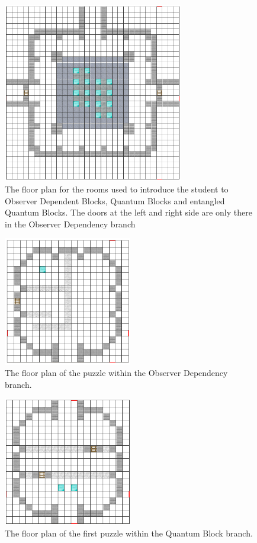 \documentclass[11pt,twoside]{report} %
\begin{document}
\begin{figure}[h!]
\centering
\includegraphics[width=0.7\textwidth]{qcraftblockrooms}
\caption{The floor plan for the rooms used to introduce the student to Observer Dependent Blocks, Quantum Blocks and entangled Quantum Blocks. The doors at the left and right side are only there in the Observer Dependency branch}
\label{fig:qcraftblockrooms}
\end{figure}

\begin{figure}[h!]
\centering
\includegraphics[width=0.5\textwidth]{odb-puzzle}
\caption{The floor plan of the puzzle within the Observer Dependency branch.}
\label{fig:odb-puzzle}
\end{figure}

\begin{figure}[h!]
\centering
\includegraphics[width=0.5\textwidth]{qb-puzzle}
\caption{The floor plan of the first puzzle within the Quantum Block branch.}
\label{fig:qb-puzzle}
\end{figure}
\end{document}
